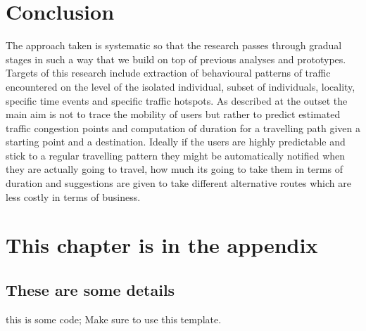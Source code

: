 \documentclass[12pt, a4paper]{report}
\newenvironment{code}
{\footnotesize\verbatim}{\endverbatim\normalfont}
\theoremstyle{definition}
\theoremstyle{definition}%
\theoremstyle{definition}%
\theoremstyle{definition}%
\theoremstyle{definition}%
\theoremstyle{definition}%
\begin{document}




\chapter{Conclusion}
 The approach taken is systematic so that the research passes through gradual stages in such a way that we build on top of previous analyses and prototypes. Targets of this research include extraction of behavioural patterns of traffic encountered on the level of the isolated individual, subset of individuals, locality, specific time events and specific traffic hotspots. As described at the outset the main aim is not to trace the mobility of users but rather to predict estimated traffic congestion points and computation of duration for a travelling path given a starting point and a destination. Ideally if the users are highly predictable and stick to a regular travelling pattern they might be automatically notified when they are actually going to travel, how much its going to take them in terms of duration and suggestions are given to take different alternative routes which are less costly in terms of business. 
 

\appendix

\chapter{This chapter is in the appendix}
\section{These are some details}
\begin{code}
this is some code;
Make sure to use this template.
\end{code}


\bibliomatter

 
 
\end{document}

